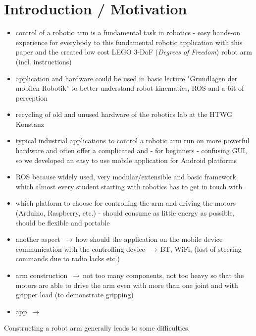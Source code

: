 \documentclass[conference]{IEEEtran}
\newcommand{\arrowright}{$\,\to\,$}
\begin{document}
\section{Introduction / Motivation}
\begin{itemize}
	\item control of a robotic arm is a fundamental task in robotics - easy hands-on experience for everybody to this fundamental robotic application with this paper and the created low cost LEGO 3-DoF (\textit{Degrees of Freedom}) robot arm  (incl. instructions)
	\item application and hardware could be used in basic lecture "Grundlagen der mobilen Robotik" to better understand robot kinematics, ROS and a bit of perception
	\item recycling of old and unused hardware of the robotics lab at the HTWG Konstanz
	\item typical industrial applications to control a robotic arm run on more powerful hardware and often offer a complicated and - for beginners - confusing GUI,  so we developed an easy to use mobile application for Android platforms
	\item ROS because widely used, very modular/extensible and basic framework which almost every student starting with robotics has to get in touch with
\end{itemize}
\par

\begin{itemize}
	\item which platform to choose for controlling the  arm and driving the motors (Arduino, Raspberry, etc.) - should consume as little energy as possible,  should be flexible and portable
	\item another aspect \arrowright how should the application on the mobile device communication with the controlling device \arrowright BT, WiFi, (lost of steering commands due to radio lacks etc.)
	\item arm construction \arrowright not too many components, not too heavy so that the motors are able to drive the arm even with more than one joint and with gripper load (to demonstrate gripping)
	\item app \arrowright 
\end{itemize}
Constructing a robot arm generally leads to some difficulties.
\end{document}
